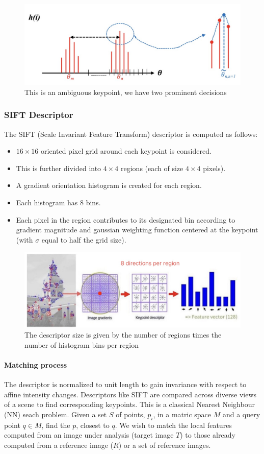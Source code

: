 \documentclass{article}
\begin{document}
\begin{figure}[htbp]
  \centering
  \includegraphics[width=0.7\linewidth]{./img/ambiguous_keypoint.jpg}
  \caption{This is an ambiguous keypoint, we have two prominent decisions}
  \label{fig:ambiguous_keypoints}
\end{figure}

\subsubsection{SIFT Descriptor}

The SIFT (Scale Invariant Feature Transform) descriptor is computed as follows:
\begin{itemize}
  \item $16\times 16$ oriented pixel grid around each keypoint is considered.
  \item This is further divided into $4 \times 4$ regions (each of size $4\times4$ pixels).
  \item A gradient orientation histogram is created for each region.
  \item Each histogram has 8 bins.
  \item Each pixel in the region contributes to its designated bin according to gradient magnitude and gaussian weighting function centered at the keypoint (with $\sigma$ equal to half the grid size).
\end{itemize}

\begin{figure}[htbp]
  \centering
  \includegraphics[width=0.7\linewidth]{./img/sift_descriptor.jpg}
  \caption{The descriptor size is given by the number of regions times the number of histogram bins per region}
  \label{fig:sift_descriptor}
\end{figure}

\paragraph{Matching process}
The descriptor is normalized to unit length to gain invariance with respect to affine intensity changes.
Descriptors like SIFT are compared across diverse views of a scene to find corresponding keypoints.
This is a classical Nearest Neighbour (NN) seach problem.
Given a set $S$ of points, $p_i$, in a matric space $M$ and a query point $q \in M$, find the $p$, closest to $q$.
We wish to match the local features computed from an image under analysis (target image $T$) to those already computed from a reference image ($R$) or a set of reference images.
\end{document}

